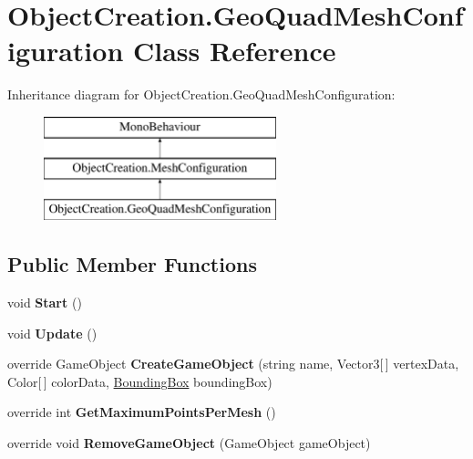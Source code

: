 \hypertarget{class_object_creation_1_1_geo_quad_mesh_configuration}{}\section{Object\+Creation.\+Geo\+Quad\+Mesh\+Configuration Class Reference}
\label{class_object_creation_1_1_geo_quad_mesh_configuration}
Inheritance diagram for Object\+Creation.\+Geo\+Quad\+Mesh\+Configuration\+:\begin{figure}[H]
\begin{center}
\leavevmode
\includegraphics[height=3.000000cm]{class_object_creation_1_1_geo_quad_mesh_configuration}
\end{center}
\end{figure}
\subsection*{Public Member Functions}
\begin{DoxyCompactItemize}
\item 
\mbox{\label{class_object_creation_1_1_geo_quad_mesh_configuration_aa3be631b1edfd389b2b4c26d434336e6}} 
void {\bfseries Start} ()
\item 
\mbox{\label{class_object_creation_1_1_geo_quad_mesh_configuration_ae18fc554f81e3097e555d05fc28cbb85}} 
void {\bfseries Update} ()
\item 
\mbox{\label{class_object_creation_1_1_geo_quad_mesh_configuration_a659c706aa4c19f3e50e7fdde21322774}} 
override Game\+Object {\bfseries Create\+Game\+Object} (string name, Vector3\mbox{[}$\,$\mbox{]} vertex\+Data, Color\mbox{[}$\,$\mbox{]} color\+Data, \hyperlink{class_cloud_data_1_1_bounding_box}{Bounding\+Box} bounding\+Box)
\item 
\mbox{\label{class_object_creation_1_1_geo_quad_mesh_configuration_a96328d95bf86ab70dfd7208579862b0a}} 
override int {\bfseries Get\+Maximum\+Points\+Per\+Mesh} ()
\item 
\mbox{\label{class_object_creation_1_1_geo_quad_mesh_configuration_a90cc3c3d05e99f0dd3c2a7407c92fe5c}} 
override void {\bfseries Remove\+Game\+Object} (Game\+Object game\+Object)
\end{DoxyCompactItemize}
